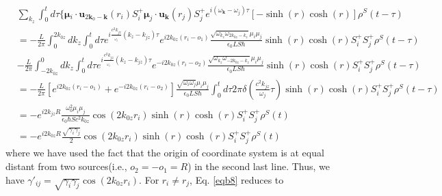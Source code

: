\documentclass{article}
\let\vec\bm
\begin{document}
\begin{equation}
\label{eqb9}\tag{A8}
\begin{split}
&\underset{k_{z}}{\sum}\int_{0}^{t}d\tau\{\vec{\mu}{}_{i}\cdot\vec{u}_{2\vec{k}_{0}-\vec{k}}(r_{i})S_{i}^{+}\vec{\mu}_{j}\cdot\vec{u}_{\vec{k}}(r_{j})S_{j}^{+}e^{i(\omega_{\vec{k}}-\omega_{j})\tau}[-\sinh(r)\cosh(r)]\rho^{S}(t-\tau)\\
&=-\frac{L}{2\pi}\int_{0}^{2k_{0z}}dk_{z}\int_{0}^{t}d\tau e^{i\frac{c^{2}k_{jz}}{_{\omega_{j}}}(k_{z}-k_{jz})\tau}e^{i2k_{0z}(r_{i}-o_{1})}\frac{\sqrt{\omega_{k_{z}}\omega_{2k_{0z}-k_{z}}}\mu_{i}\mu_{j}}{\epsilon_{0}LS\hbar}\sinh(r)\cosh(r)S_{i}^{+}S_{j}^{+}\rho^{S}(t-\tau)\\
&-\frac{L}{2\pi}\int_{-2k_{0z}}^{0}dk_{z}\int_{0}^{t}d\tau e^{i\frac{c^{2}k_{jz}}{_{\omega_{j}}}(k_{z}-k_{jz})\tau}e^{-i2k_{0z}(r_{i}-o_{2})}\frac{\sqrt{\omega_{k_{z}}\omega_{-2k_{0z}-k_{z}}}\mu_{i}\mu_{j}}{\epsilon_{0}LS\hbar}\sinh(r)\cosh(r)S_{i}^{+}S_{j}^{+}\rho^{S}(t-\tau)\\
&=-\frac{L}{2\pi}[e^{i2k_{0z}(r_{i}-o_{1})}+e^{-i2k_{0z}(r_{i}-o_{2})}]\frac{\sqrt{\omega_{i}\omega_{j}}\mu_{i}\mu_{j}}{\epsilon_{0}LS\hbar}\int_{0}^{t}d\tau2\pi\delta(\frac{c^{2}k_{jz}}{\omega_{j}}\tau)\sinh(r)\cosh(r)S_{i}^{+}S_{j}^{+}\rho^{S}(t-\tau)\\
&=-e^{i2k_{jz}R}\frac{\omega_{0}^{2}\mu_{i}\mu_{j}}{\epsilon_{0}\hbar Sc^{2}k_{0z}}\cos(2k_{0z}r_{i})\sinh(r)\cosh(r)S_{i}^{+}S_{j}^{+}\rho^{S}(t)\\
&=-e^{i2k_{0z}R}\frac{\sqrt{\gamma_{i}\gamma_{j}}}{2}\cos(2k_{0z}r_{i})\sinh(r)\cosh(r)S_{i}^{+}S_{j}^{+}\rho^{S}(t)
\end{split}
\end{equation}
where we have used the fact that the origin of coordinate system is at equal distant from two sources(i.e., $o_2=-o_1=R$) in the second last line. Thus, we have $\gamma'_{ij}=\sqrt{\gamma_{i}\gamma_{j}}\cos(2k_{0z}r_{i})$. For $r_i\neq r_j$, Eq. \eqref{eqb8} reduces to
\end{document}
